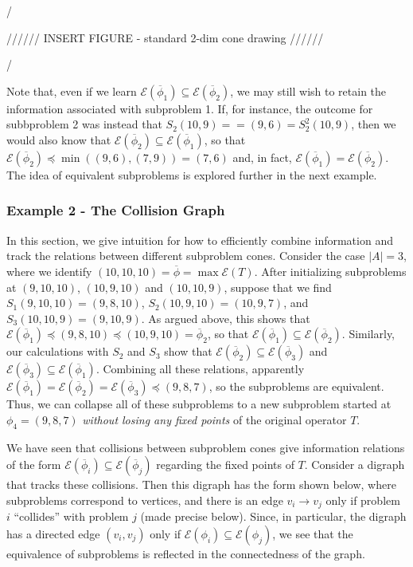 \documentclass[11pt,reqno]{amsart}
\theoremstyle{definition}
\numberwithin{equation}{section}
\newcommand{\ol}{\overline}
\newcommand{\pre}{\phi}
\newcommand{\sub}{\subseteq}
\newcommand{\fix}{\mathcal{E}}
\newcommand{\peq}{\preceq}
\newcommand{\toppre}{\ol{\pre}}
\begin{document}
/

////// INSERT FIGURE - standard 2-dim cone drawing  //////

/

Note that, even if we learn $\fix(\toppre_1) \sub \fix(\toppre_2)$, we may still wish to retain the information associated with subproblem 1. 
If, for instance, the outcome for subbproblem 2 was instead that $S_2(10,9) =  = (9,6) = S_2^2(10,9)$, then we would also know that $\fix(\toppre_2) \sub \fix(\toppre_1)$, so that $\fix(\toppre_2) \peq \min((9,6),(7,9)) = (7,6)$ and, in fact, $\fix(\toppre_1) = \fix(\toppre_2)$.
The idea of equivalent subproblems is explored further in the next example. 

\subsubsection{Example 2 - The Collision Graph}
In this section, we give intuition for how to efficiently combine information and track the relations between different subproblem cones. 
Consider the case $|A| = 3$, where we identify $(10,10,10) = \toppre = \max \fix(T)$. 
After initializing subproblems at $(9,10,10)$, $(10,9,10)$ and $(10,10,9)$, suppose that we find $S_1(9,10,10) = (9,8,10)$, $S_2(10,9,10) = (10,9,7)$, and $S_3(10,10,9) = (9,10,9)$. 
As argued above, this shows that $\fix(\toppre_1) \peq (9,8,10) \peq (10,9,10) = \toppre_2$, so that $\fix(\toppre_1) \sub \fix(\toppre_2)$. 
Similarly, our calculations with $S_2$ and $S_3$ show that $\fix(\toppre_2) \sub \fix(\toppre_3)$ and $\fix(\toppre_3) \sub \fix(\toppre_1)$. 
Combining all these relations, apparently $\fix(\toppre_1) = \fix(\toppre_2) = \fix(\toppre_3) \peq (9,8,7)$, so the subproblems are equivalent.  
Thus, we can collapse all of these subproblems to a new subproblem started at $\pre_4 = (9,8,7)$ \emph{without losing any fixed points} of the original operator $T$. 

We have seen that collisions between subproblem cones give information relations of the form $\fix(\toppre_i) \sub \fix(\toppre_j)$ regarding the fixed points of $T$.
Consider a digraph that tracks these collisions.
Then this digraph has the form shown below, where subproblems correspond to vertices, and there is an edge $v_i \to v_j$ only if problem $i$ ``collides'' with problem $j$ (made precise below). 
Since, in particular, the digraph has a directed edge $(v_i,v_j)$ only if $\fix(\pre_i) \sub \fix(\pre_j)$, we see that the equivalence of subproblems is reflected in the connectedness of the graph. 
\end{document}
